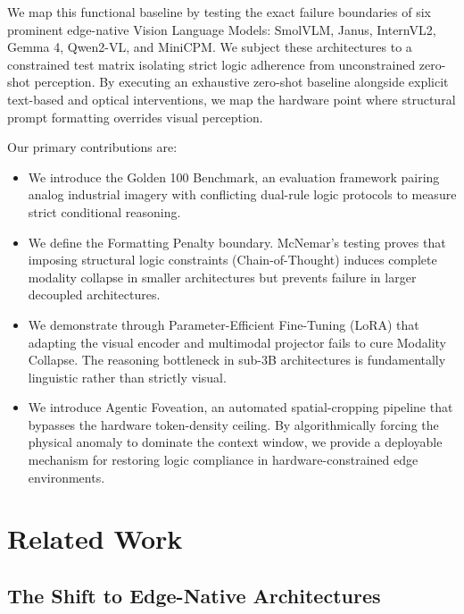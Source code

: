 \documentclass{article}
\begin{document}
We map this functional baseline by testing the exact failure boundaries of six prominent edge-native Vision Language Models: SmolVLM, Janus, InternVL2, Gemma 4, Qwen2-VL, and MiniCPM. We subject these architectures to a constrained test matrix isolating strict logic adherence from unconstrained zero-shot perception. By executing an exhaustive zero-shot baseline alongside explicit text-based and optical interventions, we map the hardware point where structural prompt formatting overrides visual perception.

Our primary contributions are:
\begin{itemize}
    \item We introduce the Golden 100 Benchmark, an evaluation framework pairing analog industrial imagery with conflicting dual-rule logic protocols to measure strict conditional reasoning.
    \item We define the Formatting Penalty boundary. McNemar's testing proves that imposing structural logic constraints (Chain-of-Thought) induces complete modality collapse in smaller architectures but prevents failure in larger decoupled architectures.
    \item We demonstrate through Parameter-Efficient Fine-Tuning (LoRA) that adapting the visual encoder and multimodal projector fails to cure Modality Collapse. The reasoning bottleneck in sub-3B architectures is fundamentally linguistic rather than strictly visual.
    \item We introduce Agentic Foveation, an automated spatial-cropping pipeline that bypasses the hardware token-density ceiling. By algorithmically forcing the physical anomaly to dominate the context window, we provide a deployable mechanism for restoring logic compliance in hardware-constrained edge environments.
\end{itemize}


\section*{Related Work}


\subsection*{The Shift to Edge-Native Architectures}
\end{document}
